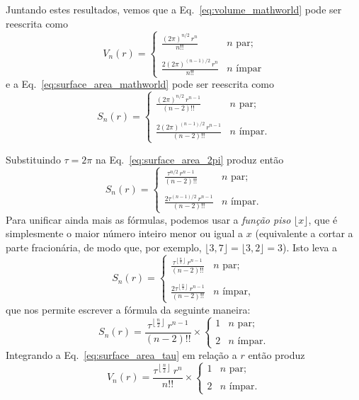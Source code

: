 Juntando estes resultados, vemos que a Eq.~\eqref{eq:volume_mathworld} pode ser reescrita como
\begin{equation}
\label{eq:volume_2pi}
V_n(r) = \begin{cases}
 \displaystyle \frac{(2\pi)^{n/2}\,r^n}{n!!} & n \text{ par}; \\ \\
 \displaystyle \frac{2(2\pi)^{(n-1)/2}\,r^n}{n!!} & n \text{ ímpar}
 \end{cases}
\end{equation}
e a Eq.~\eqref{eq:surface_area_mathworld} pode ser reescrita como
\begin{equation}
\label{eq:surface_area_2pi}
S_n(r) = \begin{cases}
\displaystyle \frac{(2\pi)^{n/2}\,r^{n-1}}{(n-2)!!} & n \text{ par}; \\ \\
\displaystyle \frac{2(2\pi)^{(n-1)/2}\,r^{n-1}}{(n-2)!!} & n \text{ ímpar}.
\end{cases}
\end{equation}

Substituindo $\tau=2\pi$ na Eq.~\eqref{eq:surface_area_2pi} produz então
\[
S_n(r) = \begin{cases}
\displaystyle \frac{\tau^{n/2}\,r^{n-1}}{(n-2)!!} & n \text{ par}; \\ \\
\displaystyle \frac{2\tau^{(n-1)/2}\,r^{n-1}}{(n-2)!!} & n \text{ ímpar}.
\end{cases} \]
Para unificar ainda mais as fórmulas, podemos usar a \emph{função piso} $\lfloor x \rfloor$, que é simplesmente o maior número inteiro menor ou igual a $x$ (equivalente a cortar a parte fracionária, de modo que, por exemplo, $\lfloor 3,7 \rfloor = \lfloor 3,2 \rfloor = 3$). Isto leva a
\[ S_n(r) = \begin{cases}
 \displaystyle \frac{\tau^{\left\lfloor \frac{n}{2} \right\rfloor}\,r^{n-1}}{(n-2)!!} & n \text{ par}; \\ \\
 \displaystyle \frac{2\tau^{\left\lfloor \frac{n}{2} \right\rfloor}\,r^{n-1}}{(n-2)!!} & n \text{ ímpar},
 \end{cases} \]
que nos permite escrever a fórmula da seguinte maneira:
\begin{equation}
\label{eq:surface_area_tau}
S_n(r) = \frac{\tau^{\left\lfloor \frac{n}{2} \right\rfloor}\,r^{n-1}}{(n-2)!!}\times \begin{cases}
1 & n \text{ par}; \\ \\
2 & n \text{ ímpar}.
\end{cases}
\end{equation}
Integrando a Eq.~\eqref{eq:surface_area_tau} em relação a $r$ então produz
\begin{equation}
\label{eq:volume_tau}
V_n(r) = \frac{\tau^{\left\lfloor \frac{n}{2} \right\rfloor}\,r^n}{n!!}\times \begin{cases}
1 & n \text{ par}; \\ \\
2 & n \text{ ímpar}.
\end{cases}
\end{equation}

